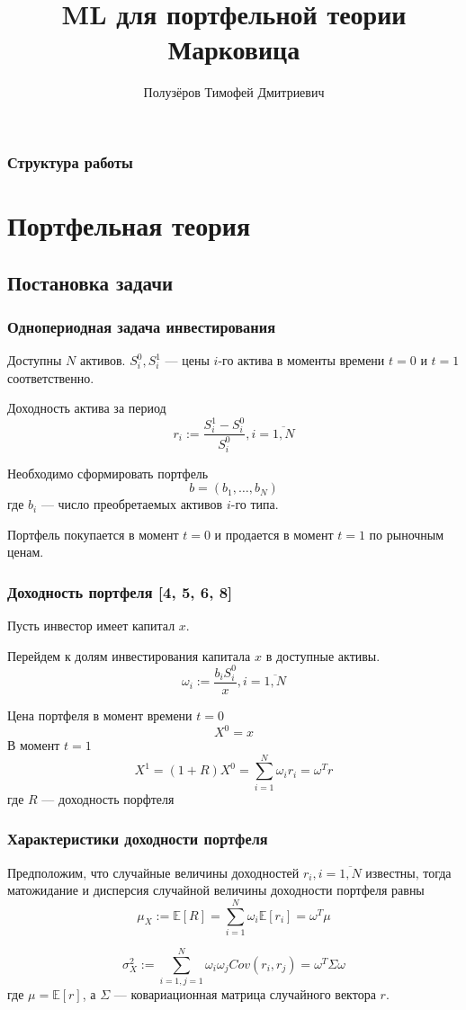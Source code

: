 \documentclass{beamer}
\title[]{ML для портфельной теории Марковица}
\subtitle{}
\author[Полузёров Т. Д.]{Полузёров Тимофей Дмитриевич}
\date{}
\newcommand{\E}[1]{\mathbb{E}\left[#1\right]} %
\newcommand{\COV}[2]{Cov\left(#1, #2\right)}
\begin{document}
\begin{frame}
    \titlepage
\end{frame}

\begin{frame}
    \begin{center}
        \frametitle{Структура работы}
        \tableofcontents
    \end{center}
\end{frame}

\section{Портфельная теория}

\subsection{Постановка задачи}

\begin{frame}
    \frametitle{Однопериодная задача инвестирования}
    Доступны $N$ активов.
    $S_i^0, S_i^1$ --- цены $i$-го актива в моменты времени $t=0$ и
    $t=1$ соответственно.

    Доходность актива за период
    \[
        r_i := \frac{S_i^1 - S_i^0}{S_i^0}, i=\overline{1, N}
    \]

    Необходимо сформировать портфель
    \[
        b = (b_1, \dots, b_N)
    \]
    где $b_i$ --- число преобретаемых активов $i$-го типа.

    Портфель покупается в момент $t=0$ и продается в момент $t=1$ по рыночным ценам.
\end{frame}

\begin{frame}
    \frametitle{Доходность портфеля [4, 5, 6, 8]}
    Пусть инвестор имеет капитал $x$.

    Перейдем к долям инвестирования капитала $x$ в доступные активы.
    \[
        \omega_i := \frac{b_i S_i^0}{x}, i=\overline{1, N}
    \]

    Цена портфеля в момент времени $t=0$
    \[
        X^0 = x
    \]
    В момент $t=1$
    \[
        X^1 = (1+R)X^0 = \sum_{i=1}^{N} \omega_i r_i = \omega^T r
    \]
    где $R$ --- доходность порфтеля
\end{frame}

\begin{frame}
    \frametitle{Характеристики доходности портфеля}

    Предположим, что случайные величины доходностей $r_i, i=\overline{1, N}$ известны, тогда
    матожидание и дисперсия случайной величины доходности портфеля равны
    \[
        \mu_X := \E{R} = \sum_{i=1}^{N} \omega_i \E{r_i} = \omega^T \mu
    \]

    \[
        \sigma_X^2 := \sum_{i=1, j=1}^{N} \omega_i \omega_j \COV{r_i}{r_j} =
        \omega^T \Sigma \omega
    \]
    где $\mu = \E{r}$, а $\Sigma$ --- ковариационная матрица случайного вектора $r$.
\end{frame}
\end{document}
